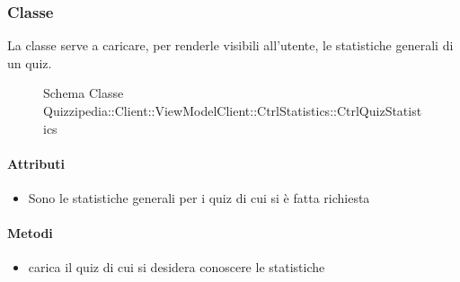 \subsubsection{Classe }
La classe serve a caricare, per renderle visibili all'utente, le statistiche generali di un quiz.
\begin{figure}[H]
\centering
\noindent{}
\caption[Schema Classe CtrlQuizStatistics]{Schema Classe Quizzipedia::Client::ViewModelClient::CtrlStatistics::CtrlQuizStatistics}
\end{figure}
\paragraph{Attributi}
\begin{itemize}
\item {}
\newline
Sono le statistiche generali per i quiz di cui si è fatta richiesta
\end{itemize}
\paragraph{Metodi}
\begin{itemize}
\item {}
\newline
carica il quiz di cui si desidera conoscere le statistiche
\newline
\end{itemize}
